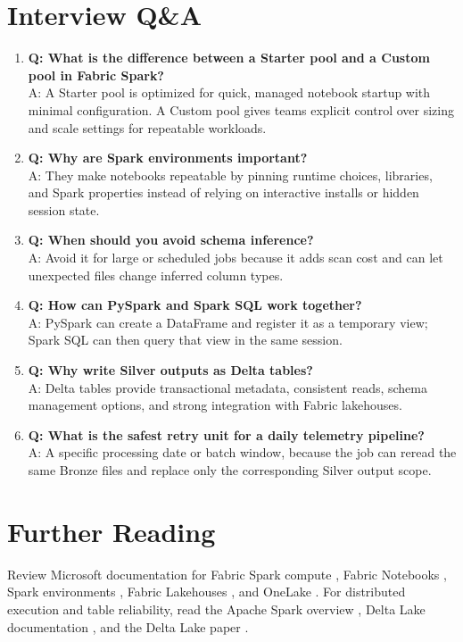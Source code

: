 \section{Interview Q\&A}
\begin{enumerate}
    \item \textbf{Q: What is the difference between a Starter pool and a Custom pool in Fabric Spark?}\\
    A: A Starter pool is optimized for quick, managed notebook startup with minimal configuration. A Custom pool gives teams explicit control over sizing and scale settings for repeatable workloads.
    \item \textbf{Q: Why are Spark environments important?}\\
    A: They make notebooks repeatable by pinning runtime choices, libraries, and Spark properties instead of relying on interactive installs or hidden session state.
    \item \textbf{Q: When should you avoid schema inference?}\\
    A: Avoid it for large or scheduled jobs because it adds scan cost and can let unexpected files change inferred column types.
    \item \textbf{Q: How can PySpark and Spark SQL work together?}\\
    A: PySpark can create a DataFrame and register it as a temporary view; Spark SQL can then query that view in the same session.
    \item \textbf{Q: Why write Silver outputs as Delta tables?}\\
    A: Delta tables provide transactional metadata, consistent reads, schema management options, and strong integration with Fabric lakehouses.
    \item \textbf{Q: What is the safest retry unit for a daily telemetry pipeline?}\\
    A: A specific processing date or batch window, because the job can reread the same Bronze files and replace only the corresponding Silver output scope.
\end{enumerate}

\section{Further Reading}
Review Microsoft documentation for Fabric Spark compute \cite{microsoftFabricSparkCompute}, Fabric Notebooks \cite{microsoftFabricNotebooks}, Spark environments \cite{microsoftFabricSparkEnvironments}, Fabric Lakehouses \cite{microsoftFabricLakehouse}, and OneLake \cite{microsoftOneLakeOverview}. For distributed execution and table reliability, read the Apache Spark overview \cite{apacheSparkOverview}, Delta Lake documentation \cite{deltaLakeDocs}, and the Delta Lake paper \cite{armbrust2020delta}.

